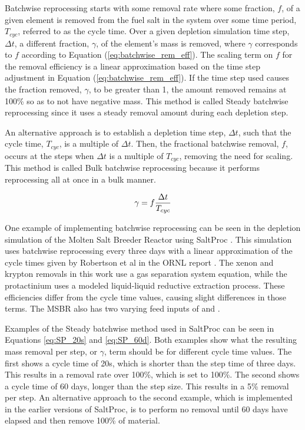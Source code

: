 Batchwise reprocessing starts with some removal rate where some fraction, $f$, of a given element is removed from the fuel salt in the system over some time period, $T_{cyc}$, referred to as the cycle time. Over a given depletion simulation time step, $\Delta t$, a different fraction, $\gamma$, of the element's mass is removed, where $\gamma$ corresponds to $f$ according to Equation (\ref{eq:batchwise_rem_eff}). The scaling term on $f$ for the removal efficiency is a linear approximation based on the time step adjustment in Equation (\ref{eq:batchwise_rem_eff}). If the time step used causes the fraction removed, $\gamma$, to be greater than 1, the amount removed remains at 100\% so as to not have negative mass. This method is called Steady batchwise reprocessing since it uses a steady removal amount during each depletion step.

An alternative approach is to establish a depletion time step, $\Delta t$, such that the cycle time, $T_{cyc}$, is a multiple of $\Delta t$. Then, the fractional batchwise removal, $f$, occurs at the steps when $\Delta t$ is a multiple of $T_{cyc}$, removing the need for scaling. This method is called Bulk batchwise reprocessing because it performs reprocessing all at once in a bulk manner.

\begin{equation} \hfill
\gamma = f \frac{\Delta t}{T_{cyc}}
\hfill\label{eq:batchwise_rem_eff} \end{equation}

One example of implementing batchwise reprocessing can be seen in the depletion simulation of the Molten Salt Breeder Reactor using SaltProc \cite{rykhlevskii_modeling_2019}. This simulation uses batchwise reprocessing every three days with a linear approximation of the cycle times given by Robertson et al in the ORNL report \cite{robertson_conceptual_1971, rykhlevskii_modeling_2019}. The xenon and krypton removals in this work use a gas separation system equation, while the protactinium uses a modeled liquid-liquid reductive extraction process. These efficiencies differ from the cycle time values, causing slight differences in those terms. The MSBR also has two varying feed inputs of  and .

Examples of the Steady batchwise method used in SaltProc can be seen in Equations \eqref{eq:SP_20s} and \eqref{eq:SP_60d}. Both examples show what the resulting mass removal per step, or $\gamma$, term should be for different cycle time values. The first shows a cycle time of 20s, which is shorter than the step time of three days. This results in a removal rate over 100\%, which is set to 100\%. The second shows a cycle time of 60 days, longer than the step size. This results in a 5\% removal per step. An alternative approach to the second example, which is implemented in the earlier versions of SaltProc, is to perform no removal until 60 days have elapsed and then remove 100\% of material.


